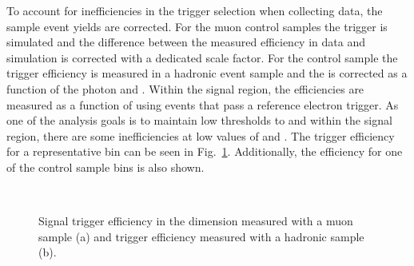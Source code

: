 To account for inefficiencies in the trigger selection when collecting
data, the \MC sample event yields are corrected. For the muon control
samples the trigger is simulated and the difference between the
measured efficiency in data and simulation is corrected with a
dedicated scale factor. For the \gj control sample the trigger
efficiency is measured in a hadronic event sample and the \MC is
corrected as a function of the photon \pT and \eta. Within the signal
region, the efficiencies are measured as a function of \MHT using
events that pass a reference electron trigger.  As one of the analysis goals
is to maintain low thresholds to \HT and \MHT within the signal
region, there are some inefficiencies at low values of \HT and \MHT.
The trigger efficiency for a representative bin can be seen in
Fig.~\ref{fig:trigEffsAt}. Additionally, the efficiency for one of the \gj control
sample bins is also shown.

\begin{figure}[h!]
  \begin{center}
     ~~\
     \\ 
    \caption{Signal trigger efficiency in the \mht dimension measured
    with a muon sample (a) and \gj trigger efficiency measured with a
    hadronic sample (b).}
    \label{fig:trigEffsAt}
  \end{center}
\end{figure}

